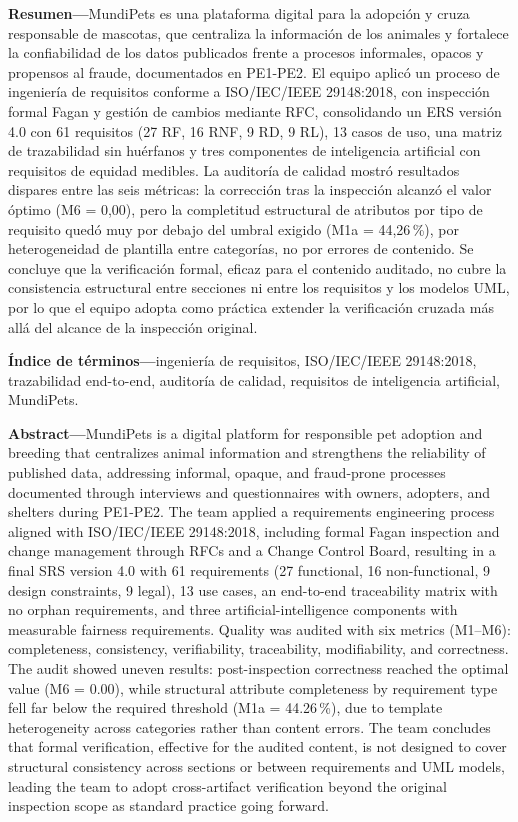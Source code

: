\documentclass[journal,onecolumn]{IEEEtran}
\begin{document}
	
\noindent\textbf{Resumen---}MundiPets es una plataforma digital para la
adopción y cruza responsable de mascotas, que centraliza la información de
los animales y fortalece la confiabilidad de los datos publicados frente a
procesos informales, opacos y propensos al fraude, documentados en PE1-PE2.
El equipo aplicó un proceso de ingeniería de requisitos conforme a
ISO/IEC/IEEE 29148:2018, con inspección formal Fagan y gestión de cambios
mediante RFC, consolidando un ERS versión 4.0 con 61 requisitos (27 RF,
16 RNF, 9 RD, 9 RL), 13 casos de uso, una matriz de trazabilidad sin
huérfanos y tres componentes de inteligencia artificial con requisitos de
equidad medibles. La auditoría de calidad mostró resultados dispares entre
las seis métricas: la corrección tras la inspección alcanzó el valor óptimo
(M6 = 0,00), pero la completitud estructural de atributos por tipo de
requisito quedó muy por debajo del umbral exigido (M1a = 44,26\,\%), por
heterogeneidad de plantilla entre categorías, no por errores de contenido.
Se concluye que la verificación formal, eficaz para el contenido auditado,
no cubre la consistencia estructural entre secciones ni entre los
requisitos y los modelos UML, por lo que el equipo adopta como práctica
extender la verificación cruzada más allá del alcance de la inspección
original.

\noindent\textbf{Índice de términos---}ingeniería de requisitos,
ISO/IEC/IEEE 29148:2018, trazabilidad end-to-end, auditoría de calidad,
requisitos de inteligencia artificial, MundiPets.

\vspace{0.4cm}
\noindent\textbf{Abstract---}MundiPets is a digital platform for responsible pet
adoption and breeding that centralizes animal information and strengthens the
reliability of published data, addressing informal, opaque, and fraud-prone
processes documented through interviews and questionnaires with owners,
adopters, and shelters during PE1-PE2. The team applied a requirements
engineering process aligned with ISO/IEC/IEEE 29148:2018, including formal
Fagan inspection and change management through RFCs and a Change Control
Board, resulting in a final SRS version 4.0 with 61 requirements
(27 functional, 16 non-functional, 9 design constraints, 9 legal), 13 use
cases, an end-to-end traceability matrix with no orphan requirements, and
three artificial-intelligence components with measurable fairness
requirements. Quality was audited with six metrics (M1--M6): completeness,
consistency, verifiability, traceability, modifiability, and correctness.
The audit showed uneven results: post-inspection correctness reached the
optimal value
(M6 = 0.00), while structural attribute completeness by requirement type
fell far below the required threshold (M1a = 44.26\,\%), due to template
heterogeneity across categories rather than content errors. The team
concludes that formal verification, effective for the audited content, is
not designed to cover structural consistency across
sections or between requirements and UML models, leading the team to adopt
cross-artifact verification beyond the original inspection scope as
standard practice going forward.
\end{document}

